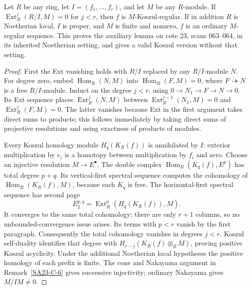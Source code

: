 \begin{lemma}\label{SA23-C-8}
Let $R$ be any ring, let $I=(f_1,\ldots,f_r)$, and let $M$ be any
$R$-module.  If $\operatorname{Ext}^j_R(R/I,M)=0$ for $j<r$,
then $f$ is $M$-Koszul-regular.  If in addition $R$ is Noetherian
local, $I$ is proper, and $M$ is finite and nonzero, $f$ is an
ordinary $M$-regular sequence.  This proves the auxiliary lemma on
cote 23, scans 063--064, in its inherited Noetherian setting, and
gives a valid Koszul version without that setting.
\end{lemma}
\begin{proof}
First the Ext vanishing holds with $R/I$ replaced by any
$R/I$-module $N$.  For degree zero, embed
$\operatorname{Hom}_R(N,M)$ into
$\operatorname{Hom}_R(F,M)=0$, where $F\twoheadrightarrow N$ is
a free $R/I$-module.  Induct on the degree $j<r$, using
$0\to N_1\to F\to N\to0$.  Its Ext sequence places
$\operatorname{Ext}^j_R(N,M)$ between
$\operatorname{Ext}^{j-1}_R(N_1,M)=0$ and
$\operatorname{Ext}^j_R(F,M)=0$.  The latter vanishes because
Ext in the first argument takes direct sums to products; this
follows immediately by taking direct sums of projective
resolutions and using exactness of products of modules.

Every Koszul homology module $H_q(K_R(f))$ is annihilated by $I$:
exterior multiplication by $e_i$ is a homotopy between
multiplication by $f_i$ and zero.  Choose an injective resolution
$M\to E^\bullet$.  The double complex
$\operatorname{Hom}_R(K_q(f),E^p)$ has total degree $p+q$.
Its vertical-first spectral sequence computes the cohomology of
$\operatorname{Hom}_R(K_R(f),M)$, because each $K_q$ is free.
The horizontal-first spectral sequence has second page
\[
 E_2^{p,q}=
 \operatorname{Ext}^p_R(H_q(K_R(f)),M).
\]
It converges to the same total cohomology; there are only $r+1$
columns, so no unbounded-convergence issue arises.  Its terms with
$p<r$ vanish by the first paragraph.  Consequently the total
cohomology vanishes in degrees $j<r$.  Koszul self-duality identifies
that degree with $H_{r-j}(K_R(f)\otimes_R M)$, proving positive
Koszul acyclicity.  Under the additional Noetherian local hypotheses
the positive homology of each prefix is finite.  The cone and
Nakayama argument in Remark~\ref{SA23-C-6} gives successive
injectivity; ordinary Nakayama gives $M/IM\ne0$.
\end{proof}
